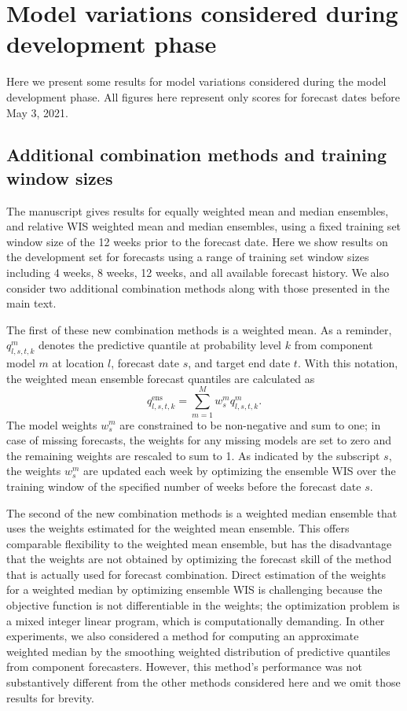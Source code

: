 \documentclass{article}
\begin{document}
\section{Model variations considered during development phase}

Here we present some results for model variations considered during the model development phase. All figures here represent only scores for forecast dates before May 3, 2021.

\subsection{Additional combination methods and training window sizes}

The manuscript gives results for equally weighted mean and median ensembles, and relative WIS weighted mean and median ensembles, using a fixed training set window size of the 12 weeks prior to the forecast date. Here we show results on the development set for forecasts using a range of training set window sizes including 4 weeks, 8 weeks, 12 weeks, and all available forecast history. We also consider two additional combination methods along with those presented in the main text.

The first of these new combination methods is a weighted mean. As a reminder,  $q^m_{l,s,t,k}$ denotes the predictive quantile at probability level $k$ from component model $m$ at location $l$, forecast date $s$, and target end date $t$. With this notation, the weighted mean ensemble forecast quantiles are calculated as
$$q^\text{ens}_{l,s,t,k} = \sum_{m = 1}^M w^m_{s} q^{m}_{l,s,t,k}.$$
The model weights $w^m_s$ are constrained to be non-negative and sum to one; in case of missing forecasts, the weights for any missing models are set to zero and the remaining weights are rescaled to sum to 1.
As indicated by the subscript $s$, the weights $w^m_s$ are updated each week by optimizing the ensemble WIS over the training window of the specified number of weeks before the forecast date $s$.

The second of the new combination methods is a weighted median ensemble that uses the weights estimated for the weighted mean ensemble. This offers comparable flexibility to the weighted mean ensemble, but has the disadvantage that the weights are not obtained by optimizing the forecast skill of the method that is actually used for forecast combination. Direct estimation of the weights for a weighted median by optimizing ensemble WIS is challenging because the objective function is not differentiable in the weights; the optimization problem is a mixed integer linear program, which is computationally demanding. In other experiments, we also considered a method for computing an approximate weighted median by the smoothing weighted distribution of predictive quantiles from component forecasters. However, this method's performance was not substantively different from the other methods considered here and we omit those results for brevity.
\end{document}

